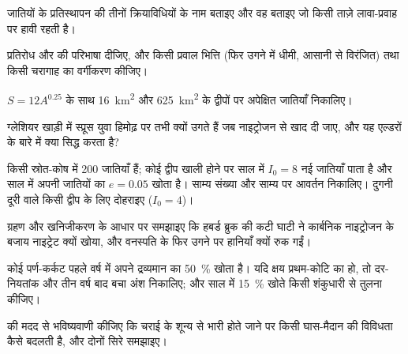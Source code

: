 \begin{exercise}[$\star$]\label{exo:b1:ecosystem-dynamics:2}
जातियों के प्रतिस्थापन की तीनों क्रियाविधियों के नाम बताइए और वह बताइए जो
किसी ताज़े लावा-प्रवाह पर हावी रहती है।
\end{exercise}

\begin{exercise}[$\star$]\label{exo:b1:ecosystem-dynamics:3}
प्रतिरोध और  की परिभाषा दीजिए, और किसी प्रवाल भित्ति (फिर
उगने में धीमी, आसानी से विरंजित) तथा किसी चरागाह का वर्गीकरण कीजिए।
\end{exercise}

\begin{exercise}[$\star$]\label{exo:b1:ecosystem-dynamics:4}
$S = 12 A^{0.25}$ के साथ \qty{16}{km^2} और \qty{625}{km^2} के द्वीपों पर
अपेक्षित जातियाँ निकालिए।
\end{exercise}

\begin{exercise}[$\star\star$]\label{exo:b1:ecosystem-dynamics:5}
ग्लेशियर खाड़ी में स्प्रूस युवा हिमोढ़ पर तभी क्यों उगते हैं जब नाइट्रोजन
से खाद दी जाए, और यह एल्डरों के बारे में क्या सिद्ध करता है?
\end{exercise}

\begin{exercise}[$\star\star$]\label{exo:b1:ecosystem-dynamics:6}
किसी स्रोत-कोष में 200 जातियाँ हैं; कोई द्वीप खाली होने पर साल में
$I_0 = 8$ नई जातियाँ पाता है और साल में अपनी जातियों का $e = 0.05$ खोता है।
साम्य संख्या और साम्य पर आवर्तन निकालिए। दुगनी दूरी वाले किसी द्वीप के
लिए दोहराइए ($I_0 = 4$)।
\end{exercise}

\begin{exercise}[$\star\star$]\label{exo:b1:ecosystem-dynamics:7}
ग्रहण और खनिजीकरण के आधार पर समझाइए कि हबर्ड ब्रुक की कटी घाटी ने
कार्बनिक नाइट्रोजन के बजाय नाइट्रेट क्यों खोया, और वनस्पति के फिर उगने पर
हानियाँ क्यों रुक गईं।
\end{exercise}

\begin{exercise}[$\star\star$]\label{exo:b1:ecosystem-dynamics:8}
कोई पर्ण-कर्कट पहले वर्ष में अपने द्रव्यमान का \qty{50}{\%} खोता है। यदि
क्षय प्रथम-कोटि का हो, तो दर-नियतांक और तीन वर्ष बाद बचा अंश निकालिए; और
साल में \qty{15}{\%} खोते किसी शंकुधारी  से तुलना कीजिए।
\end{exercise}

\begin{exercise}[$\star\star$]\label{exo:b1:ecosystem-dynamics:9}
 की मदद से भविष्यवाणी कीजिए कि चराई के शून्य से
भारी होते जाने पर किसी घास-मैदान की विविधता कैसे बदलती है, और दोनों सिरे
समझाइए।
\end{exercise}

